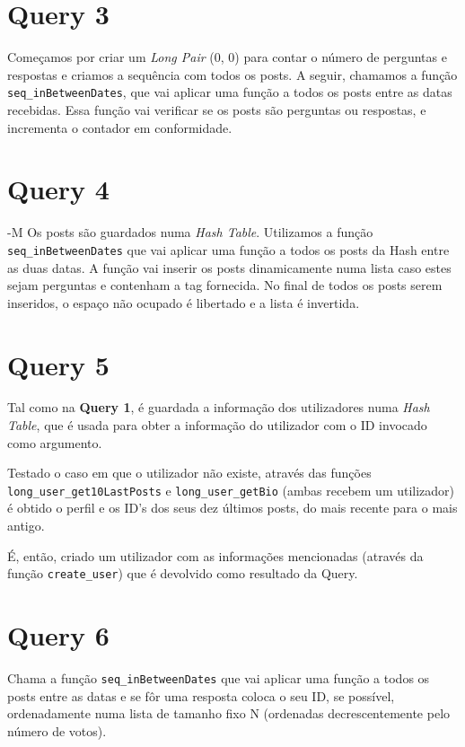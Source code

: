 \documentclass[a4paper]{report}
\begin{document}
	\section{Query 3}
	\tab Começamos por criar um \textit{Long Pair} (0, 0) para contar o número de perguntas e respostas e criamos a sequência com todos os posts. A seguir, chamamos a função \verb+seq_inBetweenDates+, que vai aplicar uma função a todos os posts entre as datas recebidas. Essa função vai verificar se os posts são perguntas ou respostas, e incrementa o contador em conformidade. 

	\section{Query 4} -M
	\tab Os posts são guardados numa \textit{Hash Table}. Utilizamos a função  \verb+seq_inBetweenDates+ que vai aplicar uma função a todos os posts da Hash entre as duas datas. A função vai inserir os posts dinamicamente numa lista caso estes sejam perguntas e contenham a tag fornecida. No final de todos os posts serem inseridos,  o espaço não ocupado é libertado e a lista é invertida.

	\section{Query 5}
	\tab Tal como na  \textbf{Query 1}, é guardada a informação dos utilizadores numa \textit{Hash Table}, que é usada para obter a informação do utilizador com o ID invocado como argumento. \par
	Testado o caso em que o utilizador não existe, através das funções\\ \verb+long_user_get10LastPosts+ e \verb+long_user_getBio+ (ambas recebem um utilizador) é obtido o perfil e os ID's dos seus dez últimos posts, do mais recente para o mais antigo.\par
	É, então, criado um utilizador com as informações mencionadas (através da função \verb+create_user+) que é devolvido como resultado da Query.

	\section{Query 6}
	\tab Chama a função \verb+seq_inBetweenDates+ que vai aplicar uma função a todos os posts entre as datas e  se fôr uma resposta coloca o seu ID, se possível, ordenadamente numa lista de tamanho fixo N (ordenadas decrescentemente pelo número de votos).
\end{document}
